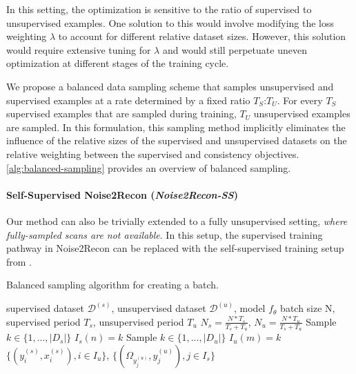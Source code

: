 \documentclass[10pt,twocolumn,letterpaper]{article}
\begin{document}
In this setting, the optimization is sensitive to the ratio of supervised to unsupervised examples. One solution to this would involve modifying the loss weighting $\lambda$ to account for different relative dataset sizes. However, this solution would require extensive tuning for $\lambda$ and would still perpetuate uneven optimization at different stages of the training cycle.

We propose a balanced data sampling scheme that samples unsupervised and supervised examples at a rate determined by a fixed ratio $T_S$:$T_U$. For every $T_S$ supervised examples that are sampled during training, $T_U$ unsupervised examples are sampled. In this formulation, this sampling method implicitly eliminates the influence of the relative sizes of the supervised and unsupervised datasets on the relative weighting between the supervised and consistency objectives. \cref{alg:balanced-sampling} provides an overview of balanced sampling.

\paragraph{Self-Supervised Noise2Recon (\textit{Noise2Recon-SS})} Our method can also be trivially extended to a fully unsupervised setting, \textit{where fully-sampled scans are not available}. In this setup, the supervised training pathway in Noise2Recon can be replaced with the self-supervised training setup from \cite{Yaman_self}.


\begin{algorithm}[t!]
 \caption{Balanced sampling algorithm for creating a batch.}
 \label{alg:balanced-sampling}
 \begin{algorithmic}[1]
 \REQUIRE supervised dataset $\mathcal{D}^{(s)}$, unsupervised dataset $\mathcal{D}^{(u)}$, model $f_\theta$
 \REQUIRE batch size N, supervised period $T_s$, unsupervised period $T_u$
 \STATE $N_s = \frac{N * T_s}{T_s + T_u}$, $N_u = \frac{N * T_u}{T_s + T_u}$
        \STATE Sample $k \in \{1,...,|D_s|\}$
        \STATE $I_s(n) = k$
\ENDFOR
{}
        \STATE Sample $k \in \{1,...,|D_u|\}$
        \STATE $I_u(m) = k$
\ENDFOR
 \RETURN $\{(y_i^{(s)}, x_i^{(s)}), i \in I_u\}$, $\{(\Omega_{y_j^{(u)}}, y_j^{(u)}), j \in I_s\}$
\end{algorithmic} 
\end{algorithm}
\end{document}

